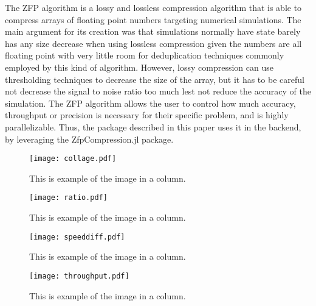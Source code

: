 \documentclass{juliacon}
\begin{document}
The ZFP algorithm is a lossy and lossless compression algorithm that is able to compress arrays of floating point numbers targeting numerical simulations. The main argument for its creation was that simulations normally have state barely has any size decrease when using lossless compression given the numbers are all floating point with very little room for deduplication techniques commonly employed by this kind of algorithm. However, lossy compression can use thresholding techniques to decrease the size of the array, but it has to be careful not decrease the signal to noise ratio too much lest not reduce the accuracy of the simulation. The ZFP algorithm allows the user to control how much accuracy, throughput or precision is necessary for their specific problem, and is highly parallelizable. Thus, the package described in this paper uses it in the backend, by leveraging the ZfpCompression.jl package.


\begin{figure*}[t]
    \centerline{\texttt{[image: collage.pdf]}}
    \caption{This is example of the image in a column.}
    \label{fig:collage}
\end{figure*}

\begin{figure}[t]
    \centerline{\texttt{[image: ratio.pdf]}}
    \caption{This is example of the image in a column.}
    \label{fig:ratio}
\end{figure}

\begin{figure}[t]
    \centerline{\texttt{[image: speeddiff.pdf]}}
    \caption{This is example of the image in a column.}
    \label{fig:speeddiff}
\end{figure}
\begin{figure*}[t]
    \centerline{\texttt{[image: throughput.pdf]}}
    \caption{This is example of the image in a column.}
    \label{fig:throughput}
\end{figure*}



%
\end{document}
